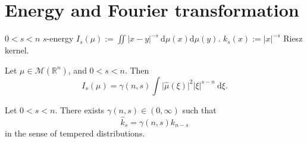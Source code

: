 \section{Energy and Fourier transformation}
$0<s<n$
$s$-energy $I_{s}(\mu):=\displaystyle \iint \lvert x-y \rvert^{-s}\ \mathrm{d}\mu (x)\mathrm{d}\mu(y)$.
$k_{s}(x):=\lvert x \rvert^{-s}$ Riesz kernel.

\begin{theorem}\label{thm:3.1}
Let $\mu \in \mathcal{M}(\mathbb{R}^{n})$, and $0<s<n$. Then
\begin{equation}\label{eq:3.1_main}
I_{s}(\mu)=\gamma(n,s)\int \lvert \hat{\mu}(\xi) \rvert ^{2}\lvert \xi \rvert ^{s-n}\ \mathrm{d}\xi.
\end{equation}
\end{theorem}

\begin{theorem}\label{thm:3.2}
Let $0<s<n$. There exists $\gamma(n,s)\in(0,\infty)$ such that
$$
\hat{k}_{s}=\gamma(n,s)k_{n-s}
$$
in the sense of tempered distributions.
\end{theorem}
